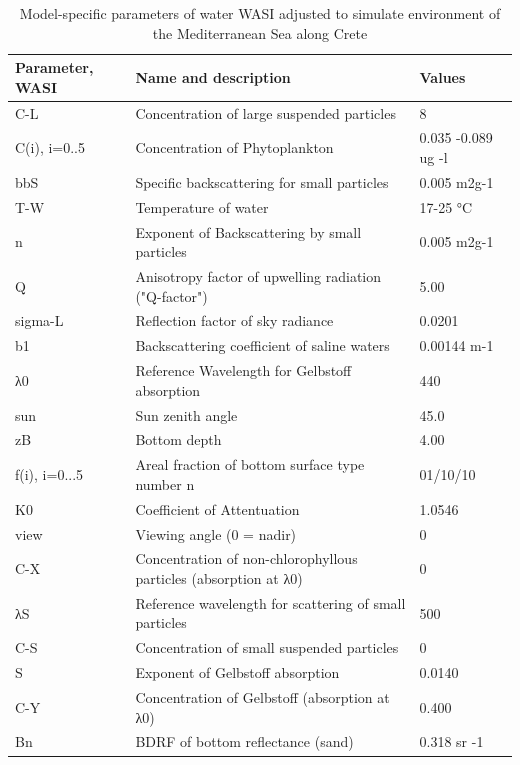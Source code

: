 \documentclass[10pt, a4paper]{article}
\begin{document}
\begin{table}
	\caption{Model-specific parameters of water WASI adjusted to simulate environment of the Mediterranean Sea along Crete}
	\centering
	 \begin{tabular}{|  p{2cm} | p{6cm} | p{25mm} | }
	    \hline
		    \textbf{Parameter, WASI} & \textbf{Name and description} & \textbf{Values} \\ \hline\hline
		    C-L & Concentration of large suspended particles & 8 \\ \hline
		   C(i), i=0..5 & Concentration of Phytoplankton & 0.035 -0.089 ug -l \\ \hline
		    bbS & Specific backscattering for small particles & 0.005 m2g-1 \\ \hline
		   T-W & Temperature of water & 17-25 °C \\ \hline
		    n & Exponent of Backscattering by small particles & 0.005 m2g-1 \\ \hline
		    Q &Anisotropy factor of upwelling radiation ("Q-factor") & 5.00 \\ \hline
		    sigma-L & Reflection factor of sky radiance & 0.0201 \\ \hline
		    b1 & Backscattering coefficient of saline waters & 0.00144 m-1 \\ \hline
		    λ0 & Reference Wavelength for Gelbstoff absorption & 440 \\ \hline
		    sun & Sun zenith angle & 45.0 \\ \hline
		    zB & Bottom depth & 4.00 \\ \hline
		   f(i), i=0...5 & Areal fraction of bottom surface type number n & 01/10/10 \\ \hline
		    K0 & Coefficient of Attentuation & 1.0546 \\ \hline
		   view & Viewing angle (0 = nadir) & 0\\ \hline
		    C-X & Concentration of non-chlorophyllous particles (absorption at λ0) & 0 \\ \hline
		   λS & Reference wavelength for scattering of small particles & 500 \\ \hline
		    C-S & Concentration of small suspended particles & 0 \\ \hline
		   S & Exponent of Gelbstoff absorption & 0.0140 \\ \hline
		    C-Y & Concentration of Gelbstoff (absorption at λ0) & 0.400 \\ \hline
		    Bn & BDRF of bottom reflectance (sand) & 0.318 sr -1\\
	    \hline
	  \end{tabular}
	   \label{tab:3}
\end{table}
\end{document}
